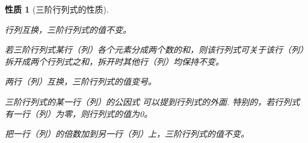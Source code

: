 \documentclass[a4paper]{book}
\newtheorem{prop}{性质}[chapter]
\newcommand{\enum}{\begin{list}{}{\setlength{\leftmargin}{0pt} \setlength{\itemindent}{2.5em} \setlength{\listparindent}{2em}}}
\begin{document}
\begin{prop}[三阶行列式的性质]\

\enum
\item[性质$1'$.] 行列互换，三阶行列式的值不变。
\item[性质$2'$.] 若三阶行列式某行（列）各个元素分成两个数的和，则该行列式可关于该行（列）拆开成两个行列式之和，拆开时其他行（列）均保持不变。
\item[性质$3'$.] 两行（列）互换，三阶行列式的值变号。
\item[性质$4'$.] 三阶行列式的某一行（列）的公因式  可以提到行列式的外面. 特别的，若行列式有一行（列）为零，则行列式的值为0。
\item[性质$5'$.] 把一行（列）的倍数加到另一行（列）上，三阶行列式的值不变。
\end{list}
\end{prop}
\end{document}
